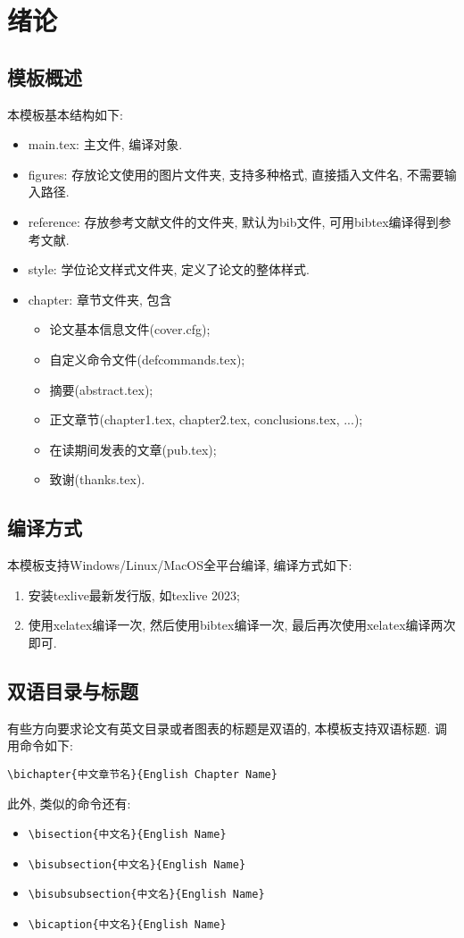 \chapter{绪论} 
\label{chapter:Introduction}

\section{模板概述}
本模板基本结构如下:

\begin{itemize}
\item main.tex: 主文件, 编译对象.
\item figures: 存放论文使用的图片文件夹, 支持多种格式, 直接插入文件名, 不需要输入路径.
\item reference: 存放参考文献文件的文件夹, 默认为bib文件, 可用bibtex编译得到参考文献.
\item style: 学位论文样式文件夹, 定义了论文的整体样式.
\item chapter: 章节文件夹, 包含
\begin{itemize}
\item 论文基本信息文件(cover.cfg);
\item 自定义命令文件(defcommands.tex);
\item 摘要(abstract.tex);
\item 正文章节(chapter1.tex, chapter2.tex, conclusions.tex, ...);
\item 在读期间发表的文章(pub.tex);
\item 致谢(thanks.tex).
\end{itemize}
\end{itemize}

\section{编译方式}
本模板支持Windows/Linux/MacOS全平台编译, 编译方式如下:
\begin{enumerate}
\item 安装texlive最新发行版, 如texlive 2023;
\item 使用xelatex编译一次, 然后使用bibtex编译一次, 最后再次使用xelatex编译两次即可.
\end{enumerate}

\section{双语目录与标题}
有些方向要求论文有英文目录或者图表的标题是双语的, 本模板支持双语标题. 调用命令如下:
\begin{verbatim}
\bichapter{中文章节名}{English Chapter Name}
\end{verbatim}
此外, 类似的命令还有: 
\begin{itemize}
\item \verb|\bisection{中文名}{English Name}|
\item \verb|\bisubsection{中文名}{English Name}|
\item \verb|\bisubsubsection{中文名}{English Name}|
\item \verb|\bicaption{中文名}{English Name}|
\end{itemize}

